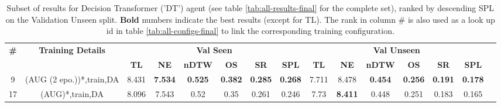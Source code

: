 \begin{table}
\centering
\caption{\label{tab:dt_dagger_envdrop}Subset of results for Decision Transformer ('DT') agent (see table \ref{tab:all-results-final} for the complete set), ranked by descending SPL on the Validation Unseen split. \textbf{Bold} numbers indicate the best results (except for TL). The rank in column \# is also used as a look up id in table \ref{tab:all-configs-final} to link the corresponding training configuration.}
\begin{tabular}{@{\hskip3pt}c@{\hskip3pt}c@{\hskip3pt}c@{\hskip3pt}c@{\hskip3pt}c@{\hskip3pt}c@{\hskip3pt}c@{\hskip3pt}c@{\hskip3pt}c@{\hskip3pt}c@{\hskip3pt}c@{\hskip3pt}c@{\hskip3pt}c@{\hskip3pt}c@{\hskip3pt}c}
\toprule
                                  \textbf{\#} & \textbf{Training Details} & \multicolumn{6}{c}{\textbf{Val Seen}} & \multicolumn{6}{c}{\textbf{Val Unseen}} \\
\cmidrule(l){3-8}\cmidrule(l){9-14}\textbf{~} &                \textbf{~} &       \textbf{TL} &     \textbf{NE} &   \textbf{nDTW} &     \textbf{OS} &     \textbf{SR} &    \textbf{SPL} &         \textbf{TL} &     \textbf{NE} &   \textbf{nDTW} &     \textbf{OS} &     \textbf{SR} &    \textbf{SPL} \\
\midrule
                                            9 &  (AUG (2 epo.))*,train,DA &             8.431 &  \textbf{7.534} &  \textbf{0.525} &  \textbf{0.382} &  \textbf{0.285} &  \textbf{0.268} &               7.711 &           8.478 &  \textbf{0.454} &  \textbf{0.256} &  \textbf{0.191} &  \textbf{0.178} \\
                                           17 &           (AUG)*,train,DA &             8.096 &           7.543 &            0.52 &            0.35 &           0.261 &           0.246 &                7.73 &  \textbf{8.411} &           0.448 &           0.251 &           0.183 &           0.165 \\
\bottomrule
\end{tabular}
\end{table}
